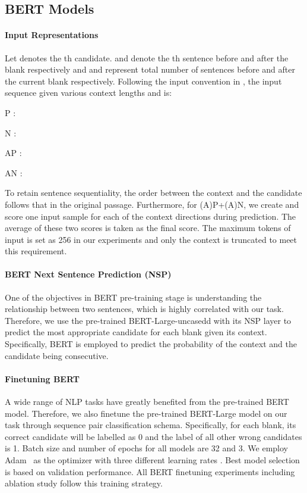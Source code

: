 \documentclass[11pt,a4paper]{article}
\newenvironment{tight_enumerate}{
\begin{enumerate}
  \setlength{\itemsep}{0pt}
  \setlength{\parskip}{0pt}
}{\end{enumerate}}
\begin{document}
\subsection{BERT Models}
\paragraph{Input Representations} \label{subsubsec:bertRepn}

Let  denotes the th candidate.  and  denote the th sentence before and after the blank respectively and  and  represent total number of sentences before and after the current blank respectively. Following the input convention in , the input sequence given various context lengths and  is:
\vspace{-\topsep}
\begin{tight_enumerate}
    \item \textsc{P} : 
    \item \textsc{N} : 
    \item \textsc{AP} : 
    \item \textsc{AN} : 
\end{tight_enumerate}


To retain sentence sequentiality, the order between the context and the candidate follows that in the original passage. Furthermore, for \textsc{(A)P+(A)N}, we create and score one input sample for each of the context directions during prediction. The average of these two scores is taken as the final score.
The maximum tokens of input is set as 256 in our experiments and only the context is truncated to meet this requirement.
\paragraph{BERT Next Sentence Prediction (NSP)}
One of the objectives in BERT pre-training stage is understanding the relationship between two sentences, which is highly correlated with our task. Therefore, we use the pre-trained BERT-Large-uncasedd  with its NSP layer to predict the most appropriate candidate for each blank given its context. Specifically, BERT is employed to predict the probability of the context and the candidate being consecutive. 
\paragraph{Finetuning BERT}
A wide range of NLP tasks have greatly benefited from the
pre-trained BERT model. Therefore, we also finetune the pre-trained BERT-Large model on our task through sequence pair classification schema. 
Specifically, for each blank, its correct candidate will be labelled as 0 and the label of all other wrong candidates is 1. Batch size and number of epochs for all models are 32 and 3. We employ Adam~\cite{kingma2014adam} as the optimizer with three different learning rates . Best model selection is based on validation performance. All BERT finetuning experiments including ablation study follow this training strategy.
 
\end{document}
